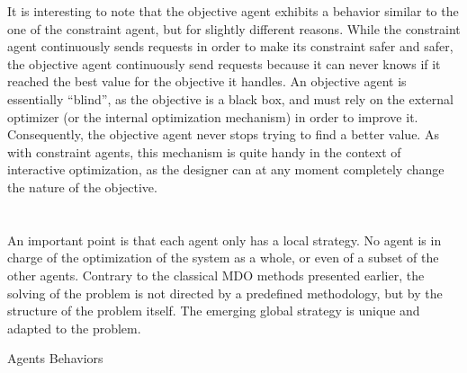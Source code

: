 It is interesting to note that the objective agent exhibits a behavior similar to the one of the constraint agent, but for slightly different reasons. While the constraint agent continuously sends requests in order to make its constraint safer and safer, the objective agent continuously send requests because it can never knows if it reached the best value for the objective it handles. An objective agent is essentially \enquote{blind}, as the objective is a black box, and must rely on the external optimizer (or the internal optimization mechanism) in order to improve it. Consequently, the objective agent never stops trying to find a better value. As with constraint agents, this mechanism is quite handy in the context of interactive optimization, as the designer can at any moment completely change the nature of the objective.

\section*{}
An important point is that each agent only has a local strategy. No agent is in charge of the optimization of the system as a whole, or even of a subset of the other agents. Contrary to the classical MDO methods presented earlier, the solving of the problem is not directed by a predefined methodology, but by the structure of the problem itself. The emerging global strategy is unique and adapted to the problem.

\begin{algorithm}
\caption{Agents Behaviors}\label{agent_algo}






\end{algorithm}


